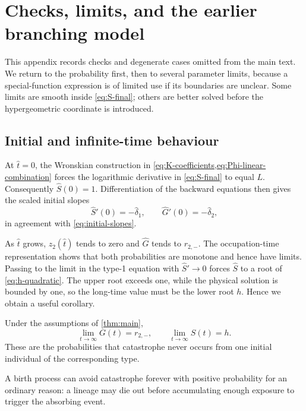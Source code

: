 \section{Checks, limits, and the earlier branching model}
\label{app:limits}

This appendix records checks and degenerate cases omitted from the main text. We return to the probability first, then to several parameter limits, because a special-function expression is of limited use if its boundaries are unclear. Some limits are smooth inside \cref{eq:S-final}; others are better solved before the hypergeometric coordinate is introduced.

\subsection{Initial and infinite-time behaviour}

At $\hat t=0$, the Wronskian construction in \cref{eq:K-coefficients,eq:Phi-linear-combination} forces the logarithmic derivative in \cref{eq:S-final} to equal $L$. Consequently $\widehat S(0)=1$. Differentiation of the backward equations then gives the scaled initial slopes
\begin{equation*}
\widehat S'(0)=-\hat\delta_1,
\qquad
\widehat G'(0)=-\hat\delta_2,
\end{equation*}
in agreement with \cref{eq:initial-slopes}.

As $\hat t$ grows, $z_2(\hat t)$ tends to zero and $\widehat G$ tends to $r_{2,-}$. The occupation-time representation shows that both probabilities are monotone and hence have limits. Passing to the limit in the type-1 equation with $\widehat S'\to0$ forces $\widehat S$ to a root of \cref{eq:h-quadratic}. The upper root exceeds one, while the physical solution is bounded by one, so the long-time value must be the lower root $h$. Hence we obtain a useful corollary.

\begin{corollary}
\label{cor:long-time}
Under the assumptions of \cref{thm:main},
\begin{equation*}
\lim_{t\to\infty}G(t)=r_{2,-},
\qquad
\lim_{t\to\infty}S(t)=h.
\end{equation*}
These are the probabilities that catastrophe never occurs from one initial individual of the corresponding type.
\end{corollary}

A birth process can avoid catastrophe forever with positive probability for an ordinary reason: a lineage may die out before accumulating enough exposure to trigger the absorbing event.

